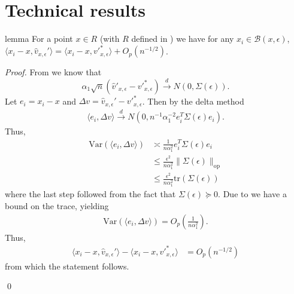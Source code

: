 \documentclass[11pt]{article}
\begin{document}
\section{Technical results}


\begin{restatable}{lemma}{} \label{lemma: projection error limit}
    For a point $x\in R$ (with $R$ defined in ) we have for any $x_i \in \mathcal{B}(x, \epsilon)$, $\langle x_i - x, \hat{v}_{x, \epsilon}'\rangle  = \langle x_i - x, v'^*_{x, \epsilon}\rangle + O_p( n^{-1/2})$. 
\end{restatable}
\noindent \textit{Proof.} From  we know that  
\[\alpha_1\sqrt{n}(\hat{v}'_{x, \epsilon} - v'^*_{x, \epsilon}) \overset{d}\rightarrow N(0, \Sigma(\epsilon)).\]
Let $e_i = x_i - x$ and $\Delta v = \hat{v}_{x, \epsilon}' - v'^*_{x, \epsilon}$. Then by the delta method
\begin{align}
    \langle e_i, \Delta v \rangle \overset{d}\rightarrow N(0, n^{-1}\alpha_1^{-2}e_i^T\Sigma(\epsilon)e_i).
\end{align}
Thus, 
\begin{align}
\text{Var}(\langle e_i, \Delta v\rangle) &\asymp  \frac{1}{n\alpha_1^{2}}e_i^T\Sigma(\epsilon)e_i \\
&\leq \frac{\epsilon^2}{n\alpha_1^{2}}\|\Sigma(\epsilon)\|_{\text{op}} \\
&\leq \frac{\epsilon^2}{n\alpha_1^{2}}\text{tr}(\Sigma(\epsilon))
\end{align}
where the last step followed from the fact that $\Sigma(\epsilon) \succeq 0$. Due to  we have a bound on the trace, yielding
\begin{align}
    \text{Var}(\langle e_i, \Delta v\rangle)  = O_p\left(\frac{1}{n\alpha_1^2}\right).
\end{align}
Thus,
\begin{align}
    \langle x_i - x, \hat{v}_{x, \epsilon}'\rangle  -  \langle x_i - x, v'^*_{x, \epsilon}\rangle &= O_p( n^{-1/2})
\end{align}
from which the statement follows.

\qed{}
\end{document}
